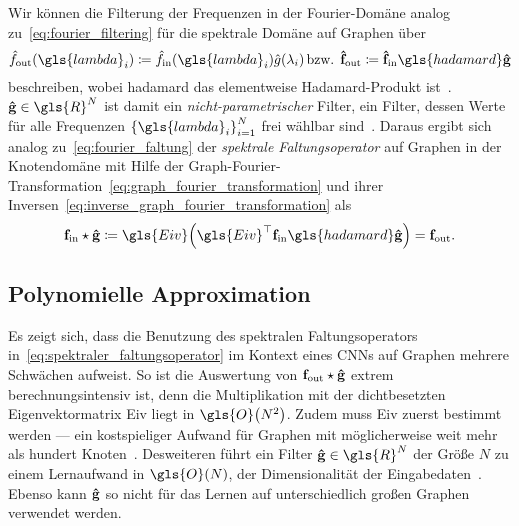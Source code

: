 Wir können die Filterung der Frequenzen in der Fourier-Domäne analog zu~\eqref{eq:fourier_filtering} für die spektrale Domäne auf Graphen über
\begin{equation*}
  \hat f_{\mathrm{out}}\left(\gls{lambda}_i\right) \coloneqq \hat f_{\mathrm{in}}\left(\gls{lambda}_i\right)\hat g\left(\lambda_i\right)\,\text{\bzw{} }\ve{\hat f}_{\mathrm{out}} \coloneqq \ve{\hat f}_{\mathrm{in}} \gls{hadamard} \ve{\hat g}
\end{equation*}
beschreiben, wobei \gls{hadamard} das elementweise Hadamard-Produkt ist~\cite{Shuman}.
$\ve{\hat g} \in \gls{R}^N$ ist damit ein \emph{nicht-parametrischer} Filter, \dhe{} ein Filter, dessen Werte für alle Frequenzen ${\left\{\gls{lambda}_i\right\}}_{i=1}^N$ frei wählbar sind~\cite{Defferrard}.
Daraus ergibt sich analog zu~\eqref{eq:fourier_faltung} der \emph{spektrale Faltungsoperator} auf Graphen in der Knotendomäne mit Hilfe der Graph-Fourier-Transformation~\eqref{eq:graph_fourier_transformation} und ihrer Inversen~\eqref{eq:inverse_graph_fourier_transformation} als~\cite{Shuman, Defferrard}
\begin{equation}
  \ve{f}_{\mathrm{in}} \star \ve{\hat g} \coloneqq \gls{Eiv}\left(\gls{Eiv}^{\top}\ve{f}_{\mathrm{in}} \gls{hadamard} \ve{\hat g}\right) = \ve{f}_{\mathrm{out}}.
  \label{eq:spektraler_faltungsoperator}
\end{equation}

\subsection{Polynomielle Approximation}
\label{polynomielle_approximation}

Es zeigt sich, dass die Benutzung des spektralen Faltungsoperators in~\eqref{eq:spektraler_faltungsoperator} im Kontext eines \glspl{CNN} auf Graphen mehrere Schwächen aufweist.
So ist \zB{} die Auswertung von $\mathbf{f}_{\mathrm{out}} \star \mathbf{\hat g}$ extrem berechnungsintensiv ist, denn die Multiplikation mit der dichtbesetzten Eigenvektormatrix \gls{Eiv} liegt in $\gls{O}\left(N^2\right)$.
Zudem muss \gls{Eiv} zuerst bestimmt werden — ein kostspieliger Aufwand für Graphen mit möglicherweise weit mehr als hundert Knoten~\cite{gcn}.
Desweiteren führt ein Filter $\ve{\hat g} \in \gls{R}^N$ der Größe $N$ zu einem Lernaufwand in $\gls{O}\left(N\right)$, \dhe{} der Dimensionalität der Eingabedaten~\cite{Defferrard}.
Ebenso kann $\mathbf{\hat g}$ so nicht für das Lernen auf unterschiedlich großen Graphen verwendet werden.

